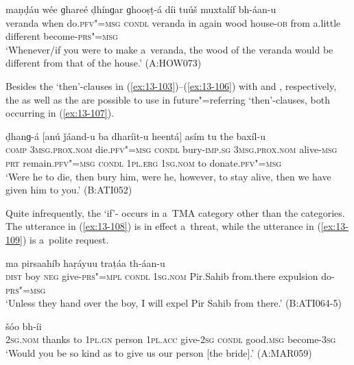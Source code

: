 \begin{exe}
\ex
\label{ex:13-106}
 maṇḍáu wée  ɡhareé ḍhínɡar ɡhooṣṭ-á díi tuúš muxtalíf bh-áan-u  \\
veranda when do.\textsc{pfv"=msg} \textsc{condl} veranda in  again wood house-\textsc{ob} from a.little different become-\textsc{prs"=msg} \\
\glt `Whenever/if you were to make a~veranda, the wood of the veranda would be different from that of the house.' (A:HOW073) 
\end{exe}

Besides the `then'-clauses in (\ref{ex:13-103})--(\ref{ex:13-106}) with  and , respectively, the  as well as the  are possible to use in future"=referring `then'-clauses, both occurring in (\ref{ex:13-107}).

\begin{exe}
\ex
\label{ex:13-107}
 ḍhanɡ-á  [anú ǰáand-u ba dharíit-u
  heentá]  asím tu the baxíl-u \\
\textsc{comp} \textsc{3msg.prox.nom} die.\textsc{pfv"=msg} \textsc{condl} bury-\textsc{imp.sg}  \textsc{3msg.prox.nom} alive-\textsc{msg} \textsc{prt} remain.\textsc{pfv"=msg} \textsc{condl}  \textsc{1pl.erg} \textsc{1sg.nom} to donate.\textsc{pfv"=msg} \\
\glt `Were he to die, then bury him, were he, however, to stay alive, then we have given him to you.' (B:ATI052) 
\end{exe}

Quite infrequently, the `if'- occurs in a~TMA category other than the  categories. The utterance in (\ref{ex:13-108}) is in effect a~threat, while the utterance in (\ref{ex:13-109}) is a~polite request.

\begin{exe}
\ex
\label{ex:13-108}
 ma  pirsaahíb haṛáyuu traṭáa th-áan-u \\
 \textsc{dist}{\protect\footnotemark} boy \textsc{neg} give-\textsc{prs"=mpl} \textsc{condl} \textsc{1sg.nom}  Pir.Sahib  from.there expulsion do-\textsc{prs"=msg} \\
\glt `Unless they hand over the boy, I will expel Pir Sahib from there.' (B:ATI064-5)

\ex
\label{ex:13-109}
 šóo bh-íi  \\
\textsc{2sg.nom} thanks to \textsc{1pl.gn} person \textsc{1pl.acc} give-\textsc{2sg}  \textsc{condl} good.\textsc{msg} become-\textsc{3sg} \\
\glt `Would you be so kind as to give us our person [the bride].' (A:MAR059) 
\end{exe}

